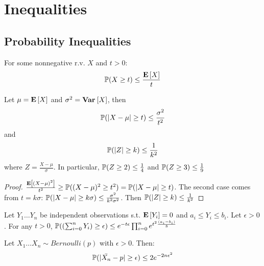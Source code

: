\documentclass[10pt]{article}
\begin{document}
\section{Inequalities}

\subsection{Probability Inequalities}

\begin{definition}
    For some nonnegative r.v. $X$ and $t > 0$:
    \[ \P(X \geq t) \leq \frac{\E{X}}{t} \]
\end{definition}

\begin{definition}
    Let $\mu = \E{X}$ and $\sigma^2 = \Var{X}$, then
    \[ \P(|X-\mu| \geq t) \leq \frac{\sigma^2}{t^2}\] 
    and \[\P(|Z| \geq k) \leq \frac{1}{k^2}\] 
    where $Z = \frac{X - \mu}{\sigma}$. In particular, $\P(Z \geq 2) \leq \frac{1}{4}$ and $\P(Z \geq 3) \leq \frac{1}{9}$
\end{definition}

\begin{proof}
    $\frac{\E{(X - \mu)^2}}{t^2} \geq \P((X-\mu)^2 \geq t^2) = \P(|X-\mu| \geq
    t)$. The second case comes from $t = k\sigma$: $\P(|X-\mu| \geq k\sigma)
    \leq \frac{\sigma^2}{k^2\sigma^2}$. Then $\P(|Z| \geq k) \leq \frac{1}{k^2}$
\end{proof}

\begin{definition}
    Let $Y_1 \dots Y_n$ be independent observations s.t. $\E{Y_i} = 0$ and $a_i
    \leq Y_i \leq b_i$. Let $\epsilon > 0$. For any $t > 0$, $\P((\sum_{i=0}^{n} Y_i)
    \geq \epsilon) \leq e^{-t\epsilon}\prod_{i=0}^n e^{t^2\frac{(a_i-b_i)}{8}}$
\end{definition}

\begin{definition}
    Let $X_1 \dots X_n \sim Bernoulli(p)$ with $\epsilon > 0$. Then:
    \[ \P(|\bar{X_n} - p| \geq \epsilon) \leq 2e^{-2n\epsilon^2}\]
\end{definition}
\end{document}
